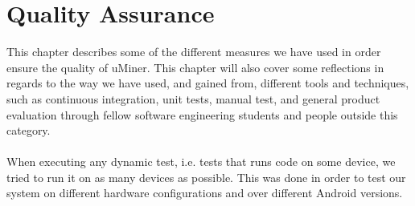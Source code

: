
\chapter{Quality Assurance}
\label{cha:quality_assurance}

This chapter describes some of the different measures we have used in order ensure the quality of uMiner. This chapter will also cover some reflections in regards to the way we have used, and gained from, different tools and techniques, such as continuous integration, unit tests, manual test, and general product evaluation through fellow software engineering students and  people outside this category. 
\\\\
When executing any dynamic test, i.e. tests that runs code on some device, we tried to run it on as many devices as possible. This was done in order to test our system on different hardware configurations and over different Android versions.














